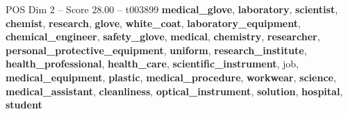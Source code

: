 \begin{textsample}{POS Dim 2 – Score 28.00 – t003899}  \label{ex:f2_pos_038}
\textbf{medical\_glove}, \textbf{laboratory}, \textbf{scientist}, \textbf{chemist}, \textbf{research}, \textbf{glove}, \textbf{white\_coat}, \textbf{laboratory\_equipment}, \textbf{chemical\_engineer}, \textbf{safety\_glove}, \textbf{medical}, \textbf{chemistry}, \textbf{researcher}, \textbf{personal\_protective\_equipment}, \textbf{uniform}, \textbf{research\_institute}, \textbf{health\_professional}, \textbf{health\_care}, \textbf{scientific\_instrument}, job, \textbf{medical\_equipment}, \textbf{plastic}, \textbf{medical\_procedure}, \textbf{workwear}, \textbf{science}, \textbf{medical\_assistant}, \textbf{cleanliness}, \textbf{optical\_instrument}, \textbf{solution}, \textbf{hospital}, \textbf{student}

\end{textsample}
